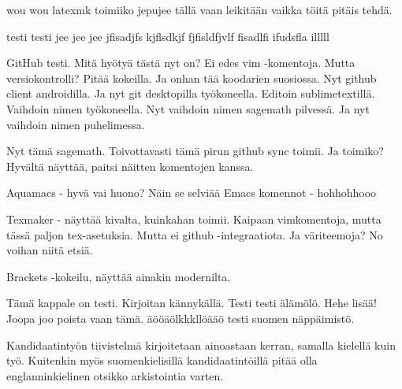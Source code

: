 \documentclass[12pt,a4paper,finnish]{tutthesis}
\begin{document}
wou wou latexmk toimiiko jepujee tällä vaan leikitään vaikka töitä
pitäis tehdä.

testi testi jee jee jee
jfisadjfs
kjflsdkjf fjfisldfjvlf fisadlfi
ifudsfla
illlll

GitHub testi. Mitä hyötyä tästä nyt on? Ei edes vim -komentoja.
Mutta versiokontrolli? Pitää kokeilla. Ja onhan tää koodarien
suosiossa. Nyt github client androidilla. Ja nyt git desktopilla
työkoneella. Editoin sublimetextillä. Vaihdoin nimen työkoneella.
Nyt vaihdoin nimen sagemath pilvessä.
Ja nyt vaihdoin nimen puhelimessa.

Nyt tämä sagemath. Toivottavasti tämä pirun github sync toimii.
Ja toimiko? Hyvältä näyttää, paitsi näitten komentojen kanssa.

Aquamacs - hyvä vai huono? Näin se selviää
Emacs komennot - hohhohhooo

Texmaker - näyttää kivalta, kuinkahan toimii. Kaipaan vimkomentoja, mutta tässä
paljon tex-asetuksia. Mutta ei github -integraatiota. Ja väriteemoja? No voihan niitä etsiä.

Brackets -kokeilu, näyttää ainakin modernilta.

Tämä kappale on testi. Kirjoitan kännykällä.
Testi testi älämölö. Hehe lisää!
Joopa joo poista vaan tämä.
äööäölkkkllöääö testi suomen näppäimistö.

Kandidaatintyön tiivistelmä kirjoitetaan ainoastaan kerran, samalla
kielellä kuin työ. Kuitenkin myös suomenkielisillä kandidaatintöillä
pitää olla englanninkielinen otsikko arkistointia varten.


\end{document}

